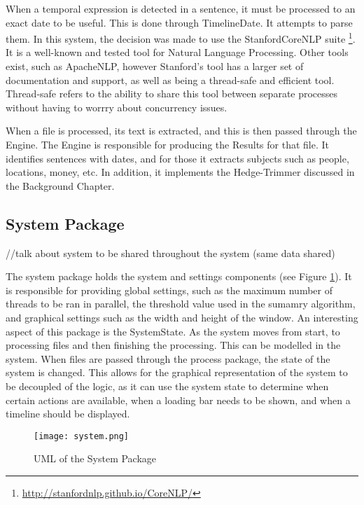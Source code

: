 \par When a temporal expression is detected in a sentence, it must be processed to an exact date to be useful. This is done through TimelineDate. It attempts to parse them. In this system, the decision was made to use the StanfordCoreNLP suite \footnote{\url{http://stanfordnlp.github.io/CoreNLP/}}. It is a well-known and tested tool for Natural Language Processing. Other tools exist, such as ApacheNLP, however Stanford's tool has a larger set of documentation and support, as well as being a thread-safe and efficient tool. Thread-safe refers to the ability to share this tool between separate processes without having to worrry about concurrency issues. 
\par When a file is processed, its text is extracted, and this is then passed through the Engine. The Engine is responsible for producing the Results for that file. It identifies sentences with dates, and for those it extracts subjects such as people, locations, money, etc. In addition, it implements the Hedge-Trimmer discussed in the Background Chapter.
\subsection{System Package}
//talk about system to be shared throughout the system (same data shared)
\par The system package holds the system and settings components (see Figure \ref{fig:system}). It is responsible for providing global settings, such as the maximum number of threads to be ran in parallel, the threshold value used in the sumamry algorithm, and graphical settings such as the width and height of the window. An interesting aspect of this package is the SystemState. As the system moves from start, to processing files and then finishing the processing. This can be modelled in the system. When files are passed through the process package, the state of the system is changed. This allows for the graphical representation of the system to be decoupled of the logic, as it can use the system state to determine when certain actions are available, when a loading bar needs to be shown, and when a timeline should be displayed.
\begin{figure}[H]
\caption{UML of the System Package}
\label{fig:system}
\texttt{[image: system.png]}
\end{figure}
